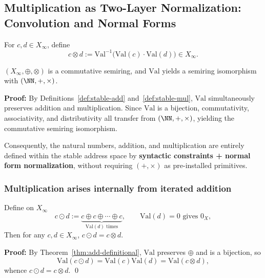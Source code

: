 \subsection{Multiplication as Two-Layer Normalization: Convolution and Normal Forms}\label{subsec:emergent-arithmetic-stable-mul}

\begin{definition}\label{def:stable-mul}
For $c,d\in X_\infty$, define
\[
c\otimes d:=\mathrm{Val}^{-1}\bigl(\mathrm{Val}(c)\cdot\mathrm{Val}(d)\bigr)\in X_\infty.
\]
\end{definition}

\begin{theorem}\label{thm:mul-definitional}
$(X_\infty,\oplus,\otimes)$ is a commutative semiring, and $\mathrm{Val}$ yields a semiring isomorphism with $(\NN,+,\times)$.
\end{theorem}

\textbf{Proof:}
By Definitions~\ref{def:stable-add} and~\ref{def:stable-mul}, $\mathrm{Val}$ simultaneously preserves addition and multiplication. Since $\mathrm{Val}$ is a bijection, commutativity, associativity, and distributivity all transfer from $(\NN,+,\times)$, yielding the commutative semiring isomorphism.

Consequently, the natural numbers, addition, and multiplication are entirely defined within the stable address space by \textbf{syntactic constraints + normal form normalization}, without requiring $(+,\times)$ as pre-installed primitives.

\subsubsection{Multiplication arises internally from iterated addition}\label{subsec:mul-as-iterated-add}
\begin{theorem}\label{thm:mul-by-iterated-add}
Define on $X_\infty$
\[
c\odot d:=\underbrace{c\oplus c\oplus\cdots\oplus c}_{\mathrm{Val}(d)\text{ times}},
\qquad
\mathrm{Val}(d)=0\text{ gives }0_X,
\]
Then for any $c,d\in X_\infty$, $c\odot d=c\otimes d$.
\end{theorem}

\textbf{Proof:}
By Theorem~\ref{thm:add-definitional}, $\mathrm{Val}$ preserves $\oplus$ and is a bijection, so
\[
\mathrm{Val}(c\odot d)=\mathrm{Val}(c)\mathrm{Val}(d)=\mathrm{Val}(c\otimes d),
\]
whence $c\odot d=c\otimes d$. \qed

